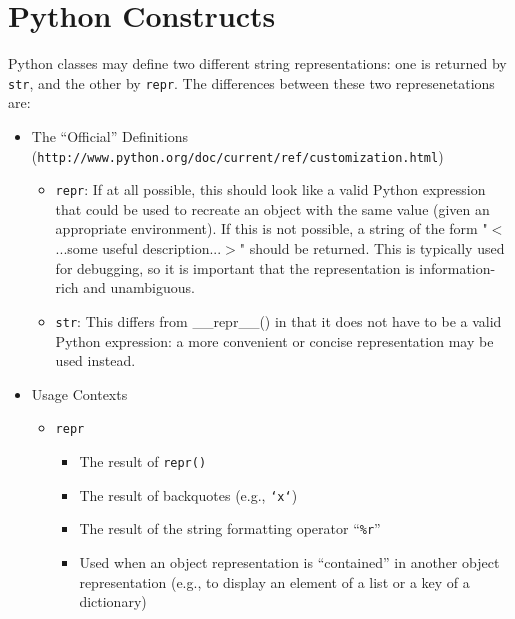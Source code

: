 \documentclass[11pt]{article}
\begin{document}
\section{Python Constructs}

  Python classes may define two different string representations: one
  is returned by \texttt{str}, and the other by \texttt{repr}.  The
  differences between these two represenetations are:

  \begin{itemize}

    \item The ``Official'' Definitions
    (\texttt{http://www.python.org/doc/current/ref/customization.html})
    \begin{itemize}
      \item 
        \texttt{repr}: If at all possible, this should look like a
        valid Python expression that could be used to recreate an
        object with the same value (given an appropriate
        environment). If this is not possible, a string of the form
        "$<$...some useful description...$>$" should be returned.
        This is typically used for debugging, so it is important that
        the representation is information-rich and unambiguous.

      \item
        \texttt{str}: This differs from \_\_repr\_\_() in that it does not
        have to be a valid Python expression: a more convenient or
        concise representation may be used instead. 
    \end{itemize}

    \item Usage Contexts
    \begin{itemize}

      \item \texttt{repr}
      \begin{itemize}
        \item The result of \texttt{repr()}
        \item The result of backquotes (e.g., \texttt{`x`})
        \item The result of the string formatting operator
            ``\texttt{\%r}''
        \item Used when an object representation is ``contained'' in
            another object representation (e.g., to display an element
            of a list or a key of a dictionary)
      \end{itemize}


\end{itemize}
\end{itemize}
\end{document}
